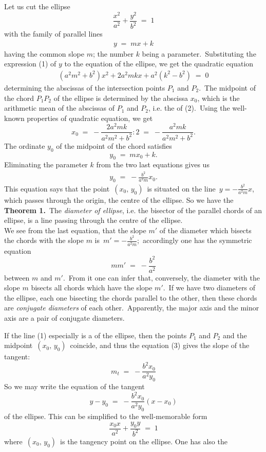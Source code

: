 \documentclass[12pt]{article}
\begin{document}
 
Let us cut the ellipse
$$\frac{x^2}{a^2}+\frac{y^2}{b^2} \;=\; 1$$
with the family of parallel lines
\begin{align}
y \;=\; mx\!+\!k
\end{align}
having the common slope $m$; the number $k$ being a parameter.\, Substituting the expression (1) of $y$ to the equation of the ellipse, we get the quadratic equation
\begin{align}
(a^2m^2\!+\!b^2)x^2+2a^2mkx+a^2(k^2\!-\!b^2) \;=\; 0
\end{align}
determining the abscissas of the intersection points $P_1$ and $P_2$.\, The midpoint of the chord $P_1P_2$ of the ellipse is determined by the abscissa $x_0$, which is the arithmetic mean of the abscissas of $P_1$ and $P_2$, i.e. the  of (2).\, Using the well-known properties of quadratic equation, we get
$$x_0 \;=\; -\frac{2a^2mk}{a^2m^2\!+\!b^2}\!:\!2 \;=\; -\frac{a^2mk}{a^2m^2+b^2}.$$
The ordinate $y_0$ of the midpoint of the chord satisfies
$$y_0 \;=\; mx_0\!+\!k.$$
Eliminating the parameter $k$ from the two last equations gives us
\begin{align}
y_0 \;=\; -\frac{b^2}{a^2m}x_0.
\end{align}
This equation says that the point \,$(x_0,\,y_0)$\, is situated on the line \,$y = -\frac{b^2}{a^2m}x$,\, which passes through the origin, the centre of the ellipse.  So we have the\\

\textbf{Theorem 1.}\, The {\em diameter of ellipse}, i.e. the bisector of the parallel chords of an ellipse, is a line passing through the centre of the ellipse.\\

We see from the last equation, that the slope $m'$ of the diameter which bisects the chords with the slope $m$ is\, $m' = -\frac{b^2}{a^2m}$;\, accordingly one has the symmetric equation
$$mm' \;=\; -\frac{b^2}{a^2}$$
between $m$ and $m'$.\, From it one can infer that, conversely, the diameter with the slope $m$ bisects all chords which have the slope $m'$.\, If we have two diameters of the ellipse, each one bisecting the chords parallel to the other, then these chords are {\em conjugate diameters} of each other.\, Apparently, the major axis and the minor axis are a pair of conjugate diameters.

If the line (1) especially is a  of the ellipse, then the points $P_1$ and $P_2$ and the midpoint\, $(x_0,\,y_0)$\, coincide, and thus the equation (3) gives the slope of the tangent:
$$m_t \;=\; -\frac{b^2x_0}{a^2y_0}$$
So we may write the equation of the tangent 
$$y\!-\!y_0 \;=\; -\frac{b^2x_0}{a^2y_0}(x\!-\!x_0)$$
of the ellipse.  This can be simplified to the well-memorable form
$$\frac{x_0x}{a^2}+\frac{y_0y}{b^2} \;=\; 1$$
where\, $(x_0,\,y_0)$\, is the tangency point on the ellipse.  One has also the\\
\end{document}

